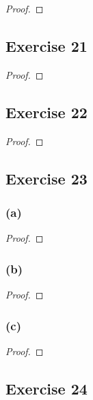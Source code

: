 \documentclass[14pt]{extarticle}
\begin{document}
\begin{proof}

\end{proof}

\subsection{Exercise 21}

\begin{proof}

\end{proof}

\subsection{Exercise 22}

\begin{proof}

\end{proof}

\subsection{Exercise 23}

\subsubsection{(a)}

\begin{proof}

\end{proof}

\subsubsection{(b)}

\begin{proof}

\end{proof}

\subsubsection{(c)}

\begin{proof}

\end{proof}

\subsection{Exercise 24}
\end{document}
